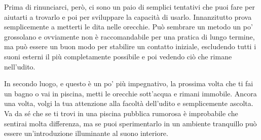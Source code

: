 Prima di rinunciarci, però, ci sono un paio di semplici tentativi che
puoi fare per aiutarti a trovarlo e poi per sviluppare la capacità di
usarlo. Innanzitutto prova semplicemente a metterti le dita nelle
orecchie. Può sembrare un metodo un po' grossolano e ovviamente non è
raccomandabile per una pratica di lungo termine, ma può essere un buon
modo per stabilire un contatto iniziale, escludendo tutti i suoni
esterni il più completamente possibile e poi vedendo ciò che rimane
nell'udito.

In secondo luogo, e questo è un po' più impegnativo, la prossima volta
che ti fai un bagno o vai in piscina, metti le orecchie sott'acqua e
rimani immobile. Ancora una volta, volgi la tua attenzione alla facoltà
dell'udito e semplicemente ascolta. Va da sé che se ti trovi in una
piscina pubblica rumorosa è improbabile che sentirai molta differenza,
ma se puoi sperimentarlo in un ambiente tranquillo può essere
un'introduzione illuminante al suono interiore.

